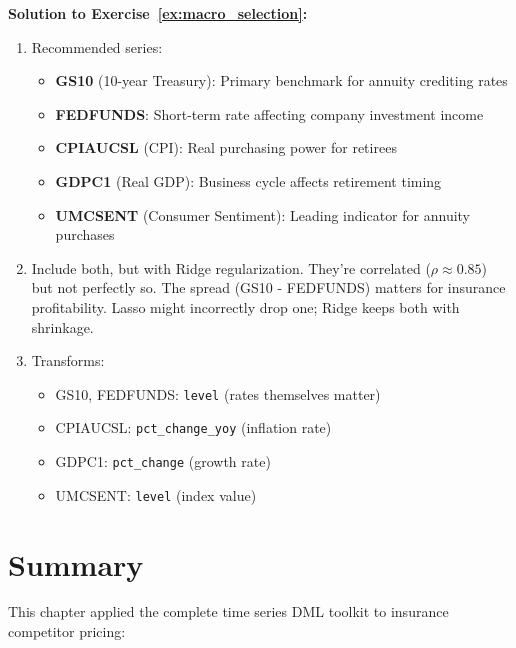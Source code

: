 \textbf{Solution to Exercise~\ref{ex:macro_selection}:}

\begin{enumerate}
    \item[(a)] Recommended series:
    \begin{itemize}
        \item \textbf{GS10} (10-year Treasury): Primary benchmark for annuity crediting rates
        \item \textbf{FEDFUNDS}: Short-term rate affecting company investment income
        \item \textbf{CPIAUCSL} (CPI): Real purchasing power for retirees
        \item \textbf{GDPC1} (Real GDP): Business cycle affects retirement timing
        \item \textbf{UMCSENT} (Consumer Sentiment): Leading indicator for annuity purchases
    \end{itemize}

    \item[(b)] Include both, but with Ridge regularization. They're correlated ($\rho \approx 0.85$) but not perfectly so. The spread (GS10 - FEDFUNDS) matters for insurance profitability. Lasso might incorrectly drop one; Ridge keeps both with shrinkage.

    \item[(c)] Transforms:
    \begin{itemize}
        \item GS10, FEDFUNDS: \texttt{level} (rates themselves matter)
        \item CPIAUCSL: \texttt{pct\_change\_yoy} (inflation rate)
        \item GDPC1: \texttt{pct\_change} (growth rate)
        \item UMCSENT: \texttt{level} (index value)
    \end{itemize}
\end{enumerate}

\section{Summary}\label{sec:ch08_summary}

This chapter applied the complete time series DML toolkit to insurance competitor pricing:

